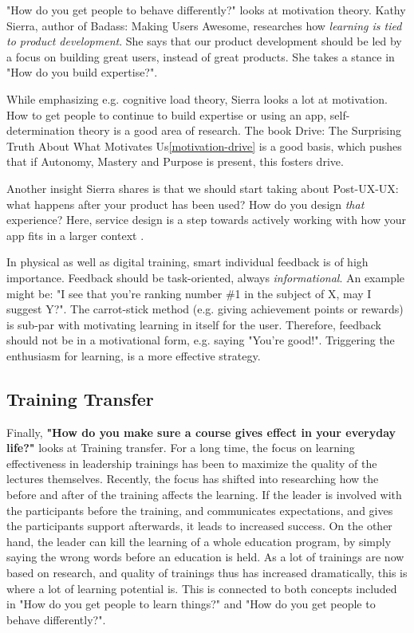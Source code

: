 "How do you get people to behave differently?" looks at motivation theory. Kathy Sierra, author of Badass: Making Users Awesome\citep{interactiondesign-badass}, researches how \textit{learning is tied to product development}. She says that our product development should be led by a focus on building great users, instead of great products. She takes a stance in "How do you build expertise?".

While emphasizing e.g. cognitive load theory, Sierra looks a lot at motivation. How to get people to continue to build expertise or using an app, self-determination theory is a good area of research. The book Drive: The Surprising Truth About What Motivates Us\ref{motivation-drive} is a good basis, which pushes that if Autonomy, Mastery and Purpose is present, this fosters drive.

Another insight Sierra shares is that we should start taking about Post-UX-UX: what happens after your product has been used? How do you design \textit{that} experience? Here, service design is a step towards actively working with how your app fits in a larger context \citep{servicedesign-ideo}.

In physical as well as digital training, smart individual feedback is of high importance. Feedback should be task-oriented, always \textit{informational}. An example might be: "I see that you're ranking number \#1 in the subject of X, may I suggest Y?". The carrot-stick method (e.g. giving achievement points or rewards) is sub-par with motivating learning in itself for the user. Therefore, feedback should not be in a motivational form, e.g. saying "You're good!". Triggering the enthusiasm for learning, is a more effective strategy.



\subsection{Training Transfer}

Finally, \textbf{"How do you make sure a course gives effect in your everyday life?"} looks at Training transfer. For a long time, the focus on learning effectiveness in leadership trainings has been to maximize the quality of the lectures themselves. Recently, the focus has shifted into researching how the before and after of the training affects the learning. If the leader is involved with the participants before the training, and communicates expectations, and gives the participants support afterwards, it leads to increased success. On the other hand, the leader can kill the learning of a whole education program, by simply saying the wrong words before an education is held. As a lot of trainings are now based on research, and quality of trainings thus has increased dramatically, this is where a lot of learning potential is. This is connected to both concepts included in "How do you get people to learn things?" and "How do you get people to behave differently?". \\

